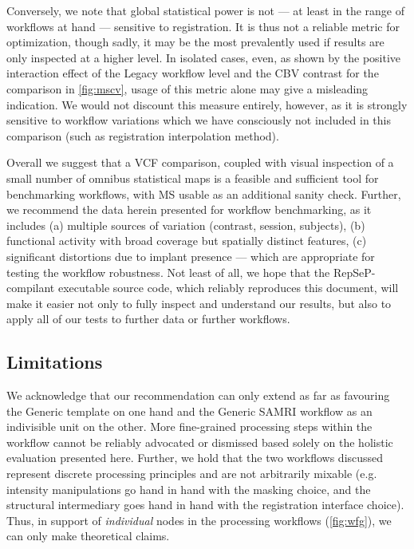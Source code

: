 Conversely, we note that global statistical power is not --- at least in the range of workflows at hand --- sensitive to registration.
It is thus not a reliable metric for optimization, though sadly, it may be the most prevalently used if results are only inspected at a higher level.
In isolated cases, even, as shown by the positive interaction effect of the Legacy workflow level and the CBV contrast for the comparison in \cref{fig:mscv}, usage of this metric alone may give a misleading indication.
We would not discount this measure entirely, however, as it is strongly sensitive to workflow variations which we have consciously not included in this comparison (such as registration interpolation method).

Overall we suggest that a VCF comparison, coupled with visual inspection of a small number of omnibus statistical maps is a feasible and sufficient tool for benchmarking workflows, with MS usable as an additional sanity check.
Further, we recommend the data herein presented for workflow benchmarking, as it includes (a) multiple sources of variation (contrast, session, subjects), (b) functional activity with broad coverage but spatially distinct features, (c) significant distortions due to implant presence --- which are appropriate for testing the workflow robustness.
Not least of all, we hope that the RepSeP-compilant executable source code, which reliably reproduces this document, will make it easier not only to fully inspect and understand our results, but also to apply all of our tests to further data or further workflows.

\subsection{Limitations}

We acknowledge that our recommendation can only extend as far as favouring the Generic template on one hand and the Generic SAMRI workflow as an indivisible unit on the other.
More fine-grained processing steps within the workflow cannot be reliably advocated or dismissed based solely on the holistic evaluation presented here.
Further, we hold that the two workflows discussed represent discrete processing principles and are not arbitrarily mixable (e.g. intensity manipulations go hand in hand with the masking choice, and the structural intermediary goes hand in hand with the registration interface choice).
Thus, in support of \textit{individual} nodes in the processing workflows (\cref{fig:wfg}), we can only make theoretical claims.
